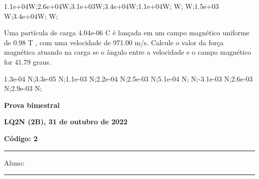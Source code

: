 \documentclass[12pt, addpoints]{exam}
\begin{document}
\begin{questions}
\begin{multicols*}{2}
\begin{oneparchoices}
\choice 1.1e+04W;\choice 2.6e+04W;\choice 3.1e+03W;\choice 3.4e+04W;\choice 1.1e+04W; W; W;\choice 1.5e+03 W;\choice 3.4e+04W; W;\end{oneparchoices}
\question[20] Uma partícula de carga 4.04e-06 C é lançada em um campo magnético uniforme de    0.98 T , com uma velocidade de 971.00 m/s. Calcule o valor da força magnética atuando na carga se o ângulo entre a velocidade e o campo magnético for   41.79 graus.

\begin{oneparchoices}
\choice 1.3e-04 N;\choice 3.3e-05 N;\choice 1.1e-03 N;\choice 2.2e-04 N;\choice 2.5e-03 N;\choice 5.1e-04 N; N;\choice -3.1e-03 N;\choice 2.6e-03 N;\choice 2.9e-03 N;\end{oneparchoices}
\end{multicols*}
\end{questions}
\newpage
        \begin{minipage}[b]{0.75\linewidth}
            \begin{flushleft}
                {\bf \large Prova bimestral}
            \end{flushleft}
            \begin{flushleft}
                {\bf \large LQ2N (2B), 31 de outubro de 2022}
            \end{flushleft}
        \end{minipage}
        \begin{minipage}[b]{0.20\linewidth}
            \begin{flushright}
                {\bf \large Código: 2}
            \end{flushright}
        \end{minipage}
        \vspace{0.5cm} \hrule \vspace{0.5cm}
        \begin{minipage}{0.75\linewidth}
            Aluno:
        \end{minipage}
        \vspace{0.5cm} \hrule \vspace{0.5cm}
\end{document}
